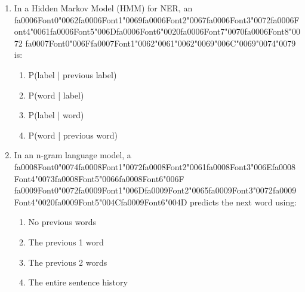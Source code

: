 \documentclass[12pt]{article}
\begin{document}
\begin{enumerate}[label=Q\arabic*.]
\begin{enumerate}[label=(\Alph*)]
    \item It uses only words (observations) and ignores labels
    \item It models transitions between labels but does not consider the words
    \item It models emissions P(word | label)
    \item It is identical to an HMM
\end{enumerate}
\item In a Hidden Markov Model (HMM) for NER, an {\csname fa0006Font0\endcsname\char"0062}{\csname fa0006Font1\endcsname\char"0069}{\csname fa0006Font2\endcsname\char"0067}{\csname fa0006Font3\endcsname\char"0072}{\csname fa0006Font4\endcsname\char"0061}{\csname fa0006Font5\endcsname\char"006D}{\csname fa0006Font6\endcsname\char"0020}{\csname fa0006Font7\endcsname\char"0070}{\csname fa0006Font8\endcsname\char"0072} {\csname fa0007Font0\endcsname\char"006F}{\csname fa0007Font1\endcsname\char"0062}{\char"0061}{\char"0062}{\char"0069}{\char"006C}{\char"0069}{\char"0074}{\char"0079} is:
\begin{enumerate}[label=(\Alph*)]
    \item P(label | previous label)
    \item P(word | label)
    \item P(label | word)
    \item P(word | previous word)
\end{enumerate}
\item In an n-gram language model, a {\csname fa0008Font0\endcsname\char"0074}{\csname fa0008Font1\endcsname\char"0072}{\csname fa0008Font2\endcsname\char"0061}{\csname fa0008Font3\endcsname\char"006E}{\csname fa0008Font4\endcsname\char"0073}{\csname fa0008Font5\endcsname\char"0066}{\csname fa0008Font6\endcsname\char"006F} {\csname fa0009Font0\endcsname\char"0072}{\csname fa0009Font1\endcsname\char"006D}{\csname fa0009Font2\endcsname\char"0065}{\csname fa0009Font3\endcsname\char"0072}{\csname fa0009Font4\endcsname\char"0020}{\csname fa0009Font5\endcsname\char"004C}{\csname fa0009Font6\endcsname\char"004D} predicts the next word using:
\begin{enumerate}[label=(\Alph*)]
    \item No previous words
    \item The previous 1 word
    \item The previous 2 words
    \item The entire sentence history

\end{enumerate}
\end{enumerate}
\end{document}
